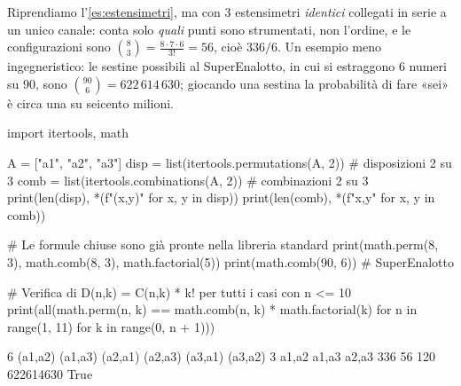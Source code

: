 \begin{esempio}
Riprendiamo l'\cref{es:estensimetri}, ma con $3$ estensimetri \emph{identici} collegati
in serie a un unico canale: conta solo \emph{quali} punti sono strumentati, non l'ordine,
e le configurazioni sono $\binom83=\frac{8\cdot7\cdot6}{3!}=56$, cioè $336/6$. Un esempio
meno ingegneristico: le sestine possibili al SuperEnalotto, in cui si estraggono $6$
numeri su $90$, sono $\binom{90}{6}=622\,614\,630$; giocando una sestina la probabilità
di fare «sei» è circa una su seicento milioni.
\end{esempio}

\begin{python}
import itertools, math

A = ["a1", "a2", "a3"]
disp = list(itertools.permutations(A, 2))   # disposizioni 2 su 3
comb = list(itertools.combinations(A, 2))   # combinazioni 2 su 3
print(len(disp), *(f"({x},{y})" for x, y in disp))
print(len(comb), *(f"{{{x},{y}}}" for x, y in comb))

# Le formule chiuse sono già pronte nella libreria standard
print(math.perm(8, 3), math.comb(8, 3), math.factorial(5))
print(math.comb(90, 6))                     # SuperEnalotto

# Verifica di D(n,k) = C(n,k) * k! per tutti i casi con n <= 10
print(all(math.perm(n, k) == math.comb(n, k) * math.factorial(k)
          for n in range(1, 11) for k in range(0, n + 1)))
\end{python}
\begin{risultato}
6 (a1,a2) (a1,a3) (a2,a1) (a2,a3) (a3,a1) (a3,a2)
3 {a1,a2} {a1,a3} {a2,a3}
336 56 120
622614630
True
\end{risultato}
